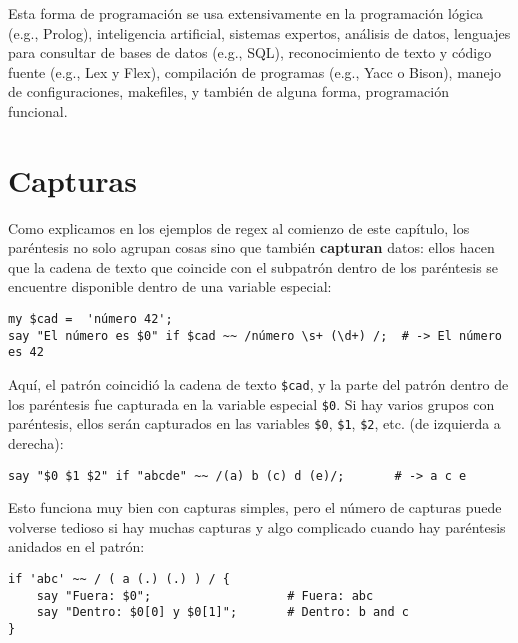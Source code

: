 
Esta forma de programación se usa extensivamente en la
programación lógica (e.g., Prolog), inteligencia artificial,
sistemas expertos, análisis de datos, lenguajes para
consultar de bases de datos (e.g., SQL), reconocimiento de
texto y código fuente (e.g., Lex y Flex), compilación de
programas (e.g., Yacc o Bison), manejo de configuraciones, 
makefiles, y también de alguna forma, programación funcional.


\section{Capturas}

Como explicamos en los ejemplos de regex al comienzo de este 
capítulo, los paréntesis no solo agrupan cosas sino que también
{\bf capturan} datos: ellos hacen que la cadena de texto que 
coincide con el subpatrón dentro de los paréntesis se 
encuentre disponible dentro de una variable especial:

\begin{lstlisting}
my $cad =  'número 42';
say "El número es $0" if $cad ~~ /número \s+ (\d+) /;  # -> El número es 42
\end{lstlisting}
%

Aquí, el patrón coincidió la cadena de texto \verb|$cad|,
y la parte del patrón dentro de los paréntesis fue capturada
en la variable especial \verb|$0|. Si hay varios grupos 
con paréntesis, ellos serán capturados en las variables
\verb|$0|, \verb|$1|, \verb|$2|, etc. (de izquierda a derecha):

\begin{lstlisting}
say "$0 $1 $2" if "abcde" ~~ /(a) b (c) d (e)/;       # -> a c e
\end{lstlisting}
%

Esto funciona muy bien con capturas simples, pero el 
número de capturas puede volverse tedioso si hay 
muchas capturas y algo complicado cuando hay paréntesis
anidados en el patrón:

\begin{lstlisting}
if 'abc' ~~ / ( a (.) (.) ) / {
    say "Fuera: $0";                   # Fuera: abc
    say "Dentro: $0[0] y $0[1]";       # Dentro: b and c
}
\end{lstlisting}

